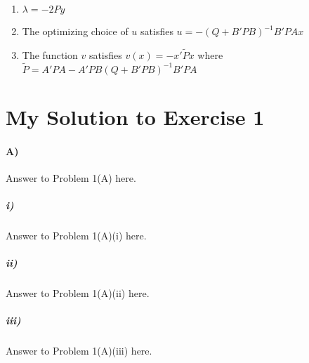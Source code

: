 \documentclass[10pt,letter]{article}
\begin{document}
\begin{enumerate}
\item $\lambda = -2Py$
\item The optimizing choice of $u$ satisfies $u = - (Q + B' P B)^{-1} B' P A x$
\item The function $v$ satisfies $v(x) = - x' \tilde P x$ where $\tilde P = A' P A - A'P B (Q + B'P B)^{-1} B' P A$
\end{enumerate}

\section*{My Solution to Exercise 1}

\paragraph{A)} Answer to Problem 1(A) here.

\subparagraph{i)} Answer to Problem 1(A)(i) here.

\subparagraph{ii)} Answer to Problem 1(A)(ii) here.

\subparagraph{iii)} Answer to Problem 1(A)(iii) here.
\end{document}
